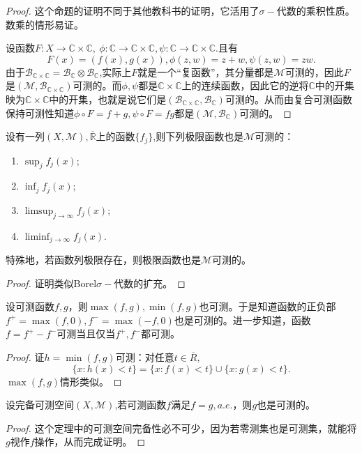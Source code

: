 \documentclass[lang=cn,10pt]{elegantbook}
\begin{document}
	\begin{proof}
		这个命题的证明不同于其他教科书的证明，它活用了\(\sigma-\)代数的乘积性质。数乘的情形易证。

		设函数\(F:X\to \mathbb{C}\times \mathbb{C},\ \phi:\mathbb{C}\to \mathbb{C}\times \mathbb{C},\psi:\mathbb{C}\to \mathbb{C}\times \mathbb{C}.\)且有
		\[F(x)=(f(x),g(x)),\phi(z,w)=z+w,\psi(z,w)=zw.\]
		由于\(\mathcal{B}_{\mathbb{C}\times \mathbb{C}}=\mathcal{B}_\mathbb{C}\otimes\mathcal{B}_\mathbb{C}\),实际上\(F\)就是一个“复函数”，其分量都是\(\mathcal{M}\)可测的，因此\(F\)是\((\mathcal{M},\mathcal{B}_{\mathbb{C}\times \mathbb{C}})\)可测的。而\(\phi,\psi\)都是\(\mathbb{C}\times \mathbb{C}\)上的连续函数，因此它的逆将\(\mathbb{C}\)中的开集映为\(\mathbb{C}\times \mathbb{C}\)中的开集，也就是说它们是\((\mathcal{B}_{\mathbb{C}\times \mathbb{C}},\mathcal{B}_\mathbb{C})\)可测的。从而由复合可测函数保持可测性知道\(\phi \circ F=f+g,\psi\circ F=fg\)都是\((\mathcal{M},\mathcal{B}_{\mathbb{C}})\)可测的。
	\end{proof}
	\begin{proposition}[P2.7]
		设有一列\((X,\mathcal{M}),\overline{\mathbb{R}}\)上的函数\(\{f_j\}\),则下列极限函数也是\(\mathcal{M}\)可测的：
		\begin{enumerate}
			\item \(\sup_jf_j(x)\);
			\item \(\inf_jf_j(x)\);
			\item \(\limsup_{j\to \infty}f_j(x)\);
			\item \(\liminf_{j\to \infty}f_j(x)\).
		\end{enumerate}
		特殊地，若函数列极限存在，则极限函数也是\(\mathcal{M}\)可测的。
	\end{proposition}
	\begin{proof}
		证明类似Borel\(\sigma-\)代数的扩充。
	\end{proof}
	\begin{corollary}[C2.8]
		设可测函数\(f,g\)，则\(\max(f,g),\min(f,g)\)也可测。于是知道函数的正负部\(f^+=\max(f,0),f^-=\max(-f,0)\)也是可测的。进一步知道，函数\(f=f^+-f^-\)可测当且仅当\(f^+,f^-\)都可测。
	\end{corollary}	
	\begin{proof}
		证\(h=\min(f,g)\)可测：对任意\(t\in \overline{R},\)
		\[\{x:h(x)<t\}=\{x:f(x)<t\}\cup \{x:g(x)<t\}.\]
		\(\max(f,g)\)情形类似。
	\end{proof}
	\begin{proposition}
		设完备可测空间\((X,\mathcal{M})\),若可测函数\(f\)满足\(f=g,a.e.\)，则\(g\)也是可测的。
	\end{proposition}
	\begin{proof}
		这个定理中的可测空间完备性必不可少，因为若零测集也是可测集，就能将\(g\)视作\(f\)操作，从而完成证明。
	\end{proof}
\end{document}
